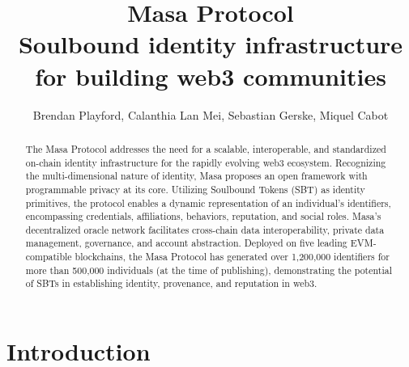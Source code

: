 \documentclass{article}
\title{%
  Masa Protocol \\
\bigskip
  \large Soulbound identity infrastructure for building web3 communities
  }
\author{Brendan Playford, Calanthia Lan Mei, Sebastian Gerske, Miquel Cabot
 }
\begin{document}
\maketitle

\vspace{0.2cm}

\begin{abstract}
    The Masa Protocol addresses the need for a scalable, interoperable, and standardized on-chain identity infrastructure for the rapidly evolving web3 ecosystem. Recognizing the multi-dimensional nature of identity, Masa proposes an open framework with programmable privacy at its core. Utilizing Soulbound Tokens (SBT) as identity primitives, the protocol enables a dynamic representation of an individual's identifiers, encompassing credentials, affiliations, behaviors, reputation, and social roles. Masa's decentralized oracle network facilitates cross-chain data interoperability, private data management, governance, and account abstraction. Deployed on five leading EVM-compatible blockchains, the Masa Protocol has generated over 1,200,000 identifiers for more than 500,000 individuals (at the time of publishing), demonstrating the potential of SBTs in establishing identity, provenance, and reputation in web3.
\end{abstract}

\section{Introduction}
\end{document}
